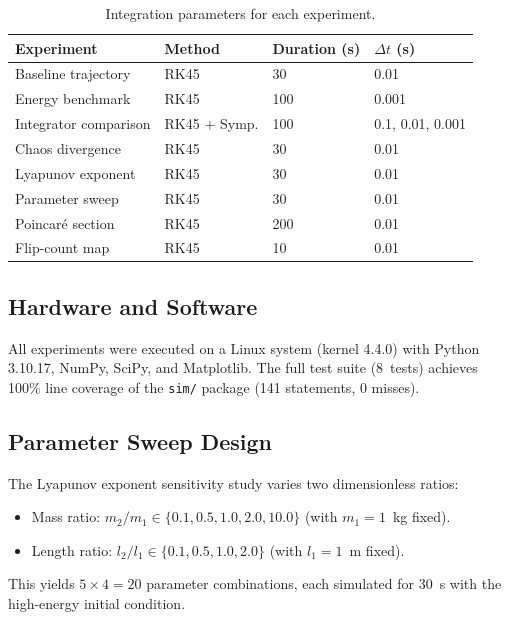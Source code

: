 \documentclass[11pt,a4paper]{article}
\newcommand{\dt}{\Delta t}
\begin{document}
\begin{table}[htbp]
\centering
\caption{Integration parameters for each experiment.}
\label{tab:integration}
\begin{tabular}{@{}llll@{}}
\toprule
\textbf{Experiment} & \textbf{Method} & \textbf{Duration (s)} & $\dt$ (s) \\
\midrule
Baseline trajectory    & RK45      & 30   & 0.01   \\
Energy benchmark       & RK45      & 100  & 0.001  \\
Integrator comparison  & RK45 + Symp. & 100 & 0.1, 0.01, 0.001 \\
Chaos divergence       & RK45      & 30   & 0.01   \\
Lyapunov exponent      & RK45      & 30   & 0.01   \\
Parameter sweep        & RK45      & 30   & 0.01   \\
Poincar\'e section     & RK45      & 200  & 0.01   \\
Flip-count map         & RK45      & 10   & 0.01   \\
\bottomrule
\end{tabular}
\end{table}

\subsection{Hardware and Software}

All experiments were executed on a Linux system (kernel 4.4.0) with Python
3.10.17, NumPy, SciPy, and Matplotlib. The full test suite (8~tests) achieves
100\% line coverage of the \texttt{sim/} package (141 statements, 0 misses).

\subsection{Parameter Sweep Design}

The Lyapunov exponent sensitivity study varies two dimensionless ratios:
\begin{itemize}
  \item Mass ratio: $m_2/m_1 \in \{0.1, 0.5, 1.0, 2.0, 10.0\}$ (with $m_1 = 1$~kg fixed).
  \item Length ratio: $l_2/l_1 \in \{0.1, 0.5, 1.0, 2.0\}$ (with $l_1 = 1$~m fixed).
\end{itemize}
This yields $5 \times 4 = 20$ parameter combinations, each simulated for 30~s
with the high-energy initial condition.
\end{document}
